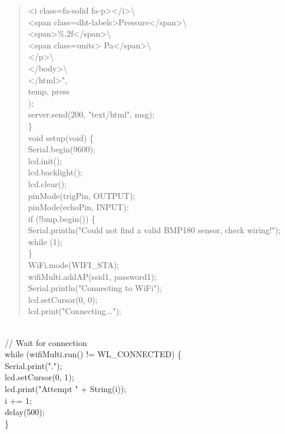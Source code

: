 \documentclass[
]{article}
\begin{document}
\begin{minipage}[b]{\linewidth}\raggedright
\begin{quote}
\textless i class=\textquotesingle fa-solid
fa-p\textquotesingle\textgreater\textless/i\textgreater\textbackslash{}\\
\textless span
class=\textquotesingle dht-labels\textquotesingle\textgreater Pressure\textless/span\textgreater\textbackslash{}\\
\textless span\textgreater\%.2f\textless/span\textgreater\textbackslash{}\\
\textless span
class=\textquotesingle units\textquotesingle\textgreater{}
Pa\textless/span\textgreater\textbackslash{}\\
\textless/p\textgreater\textbackslash{}\\
\textless/body\textgreater\textbackslash{}\\
\textless/html\textgreater",\\
temp, press\\
);\\
server.send(200, "text/html", msg);\\
\}\\
void setup(void) \{\\
Serial.begin(9600);\\
lcd.init();\\
lcd.backlight();\\
lcd.clear();\\
pinMode(trigPin, OUTPUT);\\
pinMode(echoPin, INPUT);\\
if (!bmp.begin()) \{\\
Serial.println("Could not find a valid BMP180 sensor, check wiring!");
while (1);\\
\}\\
WiFi.mode(WIFI\_STA);\\
wifiMulti.addAP(ssid1, password1);\\
Serial.println("Connecting to WiFi");\\
lcd.setCursor(0, 0);\\
lcd.print("Connecting...");
\end{quote}\strut
\end{minipage} \\



// Wait for connection\\
while (wifiMulti.run() != WL\_CONNECTED) \{\\
Serial.print(".");\\
lcd.setCursor(0, 1);\\
lcd.print("Attempt " + String(i));\\
i += 1;\\
delay(500);\\
\}
\end{document}
